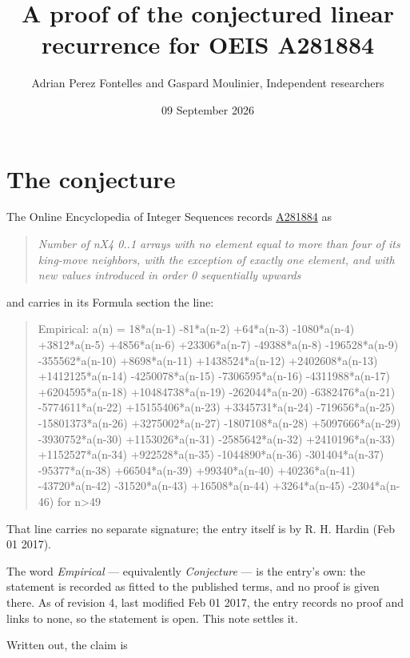 \documentclass[11pt]{article}
\title{A proof of the conjectured linear recurrence for OEIS A281884}
\author{Adrian Perez Fontelles and Gaspard Moulinier, Independent researchers}
\date{09 September 2026}
\theoremstyle{definition}
\begin{document}
\maketitle
\section{The conjecture}

The Online Encyclopedia of Integer Sequences records \href{https://oeis.org/A281884}{A281884} as

\begin{quote}\itshape Number of nX4 0..1 arrays with no element equal to more than four of its king-move neighbors, with the exception of exactly one element, and with new values introduced in order 0 sequentially upwards\end{quote}

and carries in its Formula section the line:

\begin{quote}\ttfamily Empirical: a(n) = 18*a(n-1) -81*a(n-2) +64*a(n-3) -1080*a(n-4) +3812*a(n-5) +4856*a(n-6) +23306*a(n-7) -49388*a(n-8) -196528*a(n-9) -355562*a(n-10) +8698*a(n-11) +1438524*a(n-12) +2402608*a(n-13) +1412125*a(n-14) -4250078*a(n-15) -7306595*a(n-16) -4311988*a(n-17) +6204595*a(n-18) +10484738*a(n-19) -262044*a(n-20) -6382476*a(n-21) -5774611*a(n-22) +15155406*a(n-23) +3345731*a(n-24) -719656*a(n-25) -15801373*a(n-26) +3275002*a(n-27) -1807108*a(n-28) +5097666*a(n-29) -3930752*a(n-30) +1153026*a(n-31) -2585642*a(n-32) +2410196*a(n-33) +1152527*a(n-34) +922528*a(n-35) -1044890*a(n-36) -301404*a(n-37) -95377*a(n-38) +66504*a(n-39) +99340*a(n-40) +40236*a(n-41) -43720*a(n-42) -31520*a(n-43) +16508*a(n-44) +3264*a(n-45) -2304*a(n-46) for n>49\end{quote}

That line carries no separate signature; the entry itself is by R. H. Hardin (Feb 01 2017).

The word {\itshape Empirical} --- equivalently {\itshape Conjecture} --- is the entry's own: the statement is recorded as fitted to the published terms, and no proof is given there. As of revision 4, last modified Feb 01 2017, the entry records no proof and links to none, so the statement is open. This note settles it.

Written out, the claim is
\end{document}
